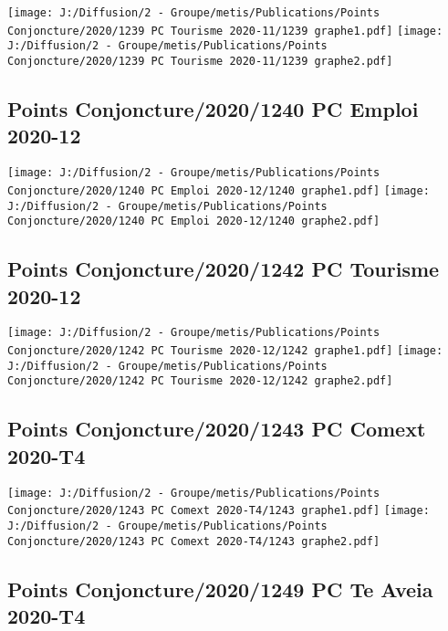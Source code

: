 \documentclass[
]{article}
\begin{document}
\texttt{[image: J:/Diffusion/2 - Groupe/metis/Publications/Points Conjoncture/2020/1239 PC Tourisme 2020-11/1239 graphe1.pdf]}
\texttt{[image: J:/Diffusion/2 - Groupe/metis/Publications/Points Conjoncture/2020/1239 PC Tourisme 2020-11/1239 graphe2.pdf]}

\hypertarget{points-conjoncture20201240-pc-emploi-2020-12}{%
\subsection{Points Conjoncture/2020/1240 PC Emploi
2020-12}\label{points-conjoncture20201240-pc-emploi-2020-12}}

\texttt{[image: J:/Diffusion/2 - Groupe/metis/Publications/Points Conjoncture/2020/1240 PC Emploi 2020-12/1240 graphe1.pdf]}
\texttt{[image: J:/Diffusion/2 - Groupe/metis/Publications/Points Conjoncture/2020/1240 PC Emploi 2020-12/1240 graphe2.pdf]}

\hypertarget{points-conjoncture20201242-pc-tourisme-2020-12}{%
\subsection{Points Conjoncture/2020/1242 PC Tourisme
2020-12}\label{points-conjoncture20201242-pc-tourisme-2020-12}}

\texttt{[image: J:/Diffusion/2 - Groupe/metis/Publications/Points Conjoncture/2020/1242 PC Tourisme 2020-12/1242 graphe1.pdf]}
\texttt{[image: J:/Diffusion/2 - Groupe/metis/Publications/Points Conjoncture/2020/1242 PC Tourisme 2020-12/1242 graphe2.pdf]}

\hypertarget{points-conjoncture20201243-pc-comext-2020-t4}{%
\subsection{Points Conjoncture/2020/1243 PC Comext
2020-T4}\label{points-conjoncture20201243-pc-comext-2020-t4}}

\texttt{[image: J:/Diffusion/2 - Groupe/metis/Publications/Points Conjoncture/2020/1243 PC Comext 2020-T4/1243 graphe1.pdf]}
\texttt{[image: J:/Diffusion/2 - Groupe/metis/Publications/Points Conjoncture/2020/1243 PC Comext 2020-T4/1243 graphe2.pdf]}

\hypertarget{points-conjoncture20201249-pc-te-aveia-2020-t4}{%
\subsection{Points Conjoncture/2020/1249 PC Te Aveia
2020-T4}\label{points-conjoncture20201249-pc-te-aveia-2020-t4}}
\end{document}
